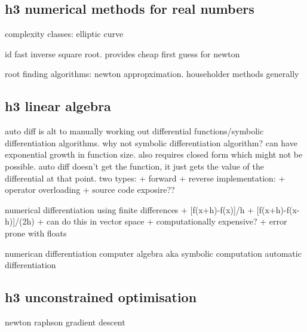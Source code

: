 \subsection{h3 numerical methods for real numbers}
complexity classes: elliptic curve

id fast inverse square root. provides cheap first guess for newton

root finding algorithms: newton appropximation. householder methods generally
\subsection{h3 linear algebra}

auto diff is alt to manually working out differential functions/symbolic differentiation algorithms.
why not symbolic differentiation algorithm? can have exponential growth in function size. also requires closed form which might not be possible.
auto diff doesn't get the function, it just gets the value of the differential at that point.
two types:
+ forward
+ reverse
implementation:
+ operator overloading
+ source code exposire??

numerical differentiation using finite differences
+ [f(x+h)-f(x)]/h
+ [f(x+h)-f(x-h)]/(2h)
+ can do this in vector space
+ computationally expensive?
+ error prone with floats

numerican differentiation
computer algebra aka symbolic computation
automatic differentiation
\subsection{h3 unconstrained optimisation}
newton raphson
gradient descent


